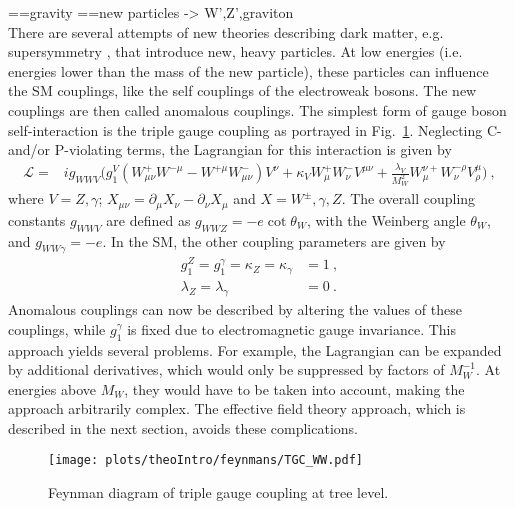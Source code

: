 ==gravity
==new particles -> W',Z',graviton\\
There are several attempts of new theories describing dark matter, e.g. supersymmetry \cite{}, that introduce new, heavy particles. At low energies (i.e. energies lower than the mass of the new particle), these particles can influence the SM couplings, like the self couplings of the electroweak bosons. The new couplings are then called anomalous couplings. The simplest form of gauge boson self-interaction is the triple gauge coupling as portrayed in Fig.~\ref{fig:theo:tgc}. Neglecting C- and/or P-violating terms, the Lagrangian for this interaction is given by \cite{EFT}
\begin{align}
\mathcal{L} =& ig_{WWV}\Big( g_1^V(W_{\mu\nu}^+W^{-\mu} - W^{+\mu}W_{\mu\nu}^-)V^{\nu} + \kappa_VW_\mu^+W_\nu^-V^{\mu\nu}  + \frac{\lambda_V}{M_W^2}W_\mu^{\nu+}W_\nu^{-\rho}V_\rho^\mu  \Big) ~,
\end{align}
where $V=Z,\gamma$; $X_{\mu\nu}=\partial_\mu X_\nu -\partial_\nu X_\mu$ and $X=W^\pm,\gamma ,Z$. The overall coupling constants $g_{WWV}$ are defined as $g_{WWZ} = -e \cot \theta_W$, with the Weinberg angle $\theta_W$, and  $g_{WW\gamma} =-e$. In the SM, the other coupling parameters are given by
\begin{align}
g_1^Z = g_1^\gamma = \kappa_Z = \kappa_\gamma &= 1 ~, \\
\lambda_Z = \lambda_\gamma &= 0 ~.
\end{align}
Anomalous couplings can now be described by altering the values of these couplings, while $g_1^\gamma$ is fixed due to electromagnetic gauge invariance. This approach yields several problems. For example, the Lagrangian can be expanded by additional derivatives, which would only be suppressed by factors of $M_W^{-1}$. At energies above $M_W$, they would have to be taken into account, making the approach arbitrarily complex. The effective field theory approach, which is described in the next section, avoids these complications.
\begin{figure}[b]
	\centering
	\texttt{[image: plots/theoIntro/feynmans/TGC\_WW.pdf]}
	\caption[Feynman diagram of triple gauge coupling at tree level.]{Feynman diagram of triple gauge coupling at tree level.}
	\label{fig:theo:tgc}
\end{figure}


